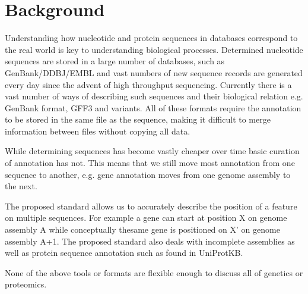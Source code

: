 \section*{Background}
Understanding how nucleotide and protein sequences in databases correspond to the real world is key to understanding biological processes.
Determined nucleotide sequences are stored in a large number of databases, such as GenBank/DDBJ/EMBL and vast numbers of new sequence records are generated every day since the advent of high throughput sequencing. Currently there is a vast number of ways of describing such sequences and their biological relation e.g. GenBank format, GFF3 and variants. All of these formats require the annotation to be stored in the same file as the sequence, making it difficult to merge information between files without copying all data.

While determining sequences has become vastly cheaper over time basic curation of annotation has not. This means that we still move most annotation from one sequence to another, e.g. gene annotation moves from one genome assembly to the next.

The proposed standard allows us to accurately describe the position of a feature on multiple sequences. For example a gene can start at position X on genome assembly A while conceptually thesame gene is positioned on X' on genome assembly A+1. The proposed standard also deals with incomplete assemblies as well as protein sequence annotation such as found in UniProtKB.

None of the above tools or formats are flexible enough to discuss all of genetics or proteomics. 


